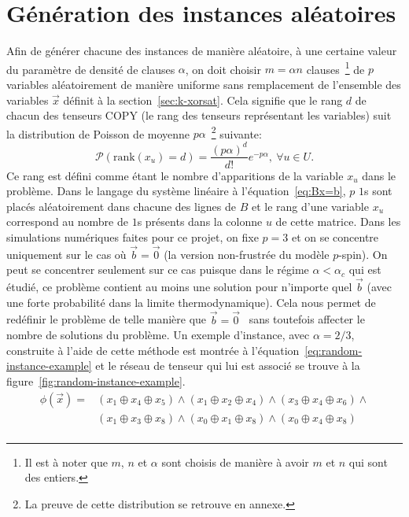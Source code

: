 \section{Génération des instances aléatoires}\label{sec:random-instances}
Afin de générer chacune des instances de manière aléatoire, à une certaine valeur du paramètre de densité de clauses $\alpha$, on doit choisir $m = \alpha n$ clauses~\footnote{Il est à noter que $m$, $n$ et $\alpha$ sont choisis de manière à avoir $m$ et $n$ qui sont des entiers.} de $p$ variables aléatoirement de manière uniforme sans remplacement de l'ensemble des variables $\vec{x}$ définit à la section~\ref{sec:k-xorsat}.
Cela signifie que le rang $d$ de chacun des tenseurs COPY (le rang des tenseurs représentant les variables) suit la distribution de Poisson de moyenne $p\alpha$~\footnote{La preuve de cette distribution se retrouve en annexe.} suivante:
\begin{equation}\label{eq:poisson}
    \mathcal{P}(\text{rank}(x_u) = d) = \frac{(p\alpha)^d}{d!} e^{-p\alpha}\mathrm{, }\ \forall u \in U.
\end{equation}
Ce rang est défini comme étant le nombre d'apparitions de la variable $x_u$ dans le problème.
Dans le langage du système linéaire à l'équation~\ref{eq:Bx=b}, $p$ $1$s sont placés aléatoirement dans chacune des lignes de $B$ et le rang d'une variable $x_u$ correspond au nombre de $1$s présents dans la colonne $u$ de cette matrice.
Dans les simulations numériques faites pour ce projet, on fixe $p = 3$ et on se concentre uniquement sur le cas où $\vec{b} = \vec{0}$ (la version non-frustrée du modèle $p$-spin).
On peut se concentrer seulement sur ce cas puisque dans le régime $\alpha < \alpha_c$ qui est étudié, ce problème contient au moins une solution pour n'importe quel $\vec{b}$ (avec une forte probabilité dans la limite thermodynamique).
Cela nous permet de redéfinir le problème de telle manière que $\vec{b} = \vec{0}$~\cite{mezard_alternative_2002, braunstein_complexity_2002} sans toutefois affecter le nombre de solutions du problème.
Un exemple d'instance, avec $\alpha = 2/3$, construite à l'aide de cette méthode est montrée à l'équation~\ref{eq:random-instance-example} et le réseau de tenseur qui lui est associé se trouve à la figure~\ref{fig:random-instance-example}.
\begin{equation}\label{eq:random-instance-example}
    \begin{split}
        \phi(\vec{x}) = &(x_1 \oplus x_4 \oplus x_5) \wedge (x_1 \oplus x_2 \oplus x_4) \wedge (x_3 \oplus x_4 \oplus x_6) \wedge\\
        &(x_1 \oplus x_3 \oplus x_8) \wedge (x_0 \oplus x_1 \oplus x_8) \wedge (x_0 \oplus x_4 \oplus x_8)\\
    \end{split}
\end{equation}
